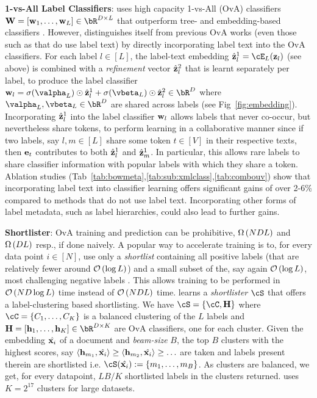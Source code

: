 \textbf{1-vs-All Label Classifiers}: \alg uses high capacity 1-vs-All (OvA) classifiers $\vW = [\vw_1,\ldots,\vw_L] \in \bR^{D \times L}$ that outperform tree- and embedding-based classifiers \cite{Chang20,Jain19,Babbar19,Prabhu18b,Yen17,Babbar17}. However, \alg distinguishes itself from previous OvA works (even those such as \cite{Chang20} that do use label text) by directly incorporating label text into the OvA classifiers. For each label $l \in [L]$, the label-text embedding $\hat\vz^1_l = \cE_L(\vz_l)$ (see above) is combined with a \emph{refinement} vector $\hat{\protect{\mathbf{z}}}^2_l$ that is learnt separately per label, to produce the label classifier $\vw_l = \sigma(\valpha_L) \odot \hat\vz^1_l + \sigma(\vbeta_L) \odot \hat\vz^2_l \in \bR^D$ where $\valpha_L, \vbeta_L \in \bR^D$ are shared across labels (see Fig~\ref{fig:embedding}). Incorporating $\hat{\protect{\mathbf{z}}}^1_l$ into the label classifier $\protect{\mathbf{w}}_l$ allows labels that never co-occur, but nevertheless share tokens, to perform learning in a collaborative manner since if two labels, say $l,m \in [L]$ share some token $t \in [V]$ in their respective texts, then $\protect{\mathbf{e}}_t$ contributes to both $\hat{\protect{\mathbf{z}}}^1_l$ and $\hat{\protect{\mathbf{z}}}^1_m$. In particular, this allows rare labels to share classifier information with popular labels with which they share a token. Ablation studies (Tab~\ref{tab:bowmeta},\ref{tab:sub:xmlclass},\ref{tab:combouv}) show that incorporating label text into classifier learning offers \alg significant gains of over 2-6\% compared to methods that do not use label text. Incorporating other forms of label metadata, such as label hierarchies, could also lead to further gains.

\textbf{Shortlister}: OvA training and prediction can be prohibitive, $\Omega\left({{NDL}}\right)$ and $\Omega\left({{DL}}\right)$ resp., if done naively. A popular way to accelerate training is to, for every data point $i \in [N]$, use only a \emph{shortlist} containing all positive labels (that are relatively fewer around ${\mathcal O}\left({{\log L}}\right)$) and a small subset of the, say again ${\mathcal O}\left({{\log L}}\right)$, most challenging negative labels \cite{Chang20,Jain19,Khandagale19,Prabhu18b,Yen17,Bhatia15}. This allows training to be performed in ${\mathcal O}\left({{ND\log L}}\right)$ time instead of ${\mathcal O}\left({{NDL}}\right)$ time. \alg learns a \emph{shortlister} $\cS$ that offers a label-clustering based shortlisting. We have $\cS = \bc{\cC, \vH}$ where $\cC = \bc{C_1,\ldots,C_K}$ is a balanced clustering of the $L$ labels and $\vH = [\vh_1,\ldots,\vh_K] \in \bR^{D \times K}$ are OvA classifiers, one for each cluster. Given the embedding $\hat{\mathbf{x}_{i}}$ of a document and \emph{beam-size} $B$, the top $B$ clusters with the highest scores, say $\left\langle{\protect{\mathbf{h}}_{m_1}},{\hat{\mathbf{x}_{i}}}\right\rangle \geq \left\langle{\protect{\mathbf{h}}_{m_2}},{\hat{\mathbf{x}_{i}}}\right\rangle \geq \ldots$ are taken and labels present therein are shortlisted i.e. $\cS(\hat\vx) := \bc{m_1,\ldots,m_B}$. As clusters are balanced, we get, for every datapoint, $LB/K$ shortlisted labels in the clusters returned. \alg uses $K = 2^{17}$ clusters for large datasets.

